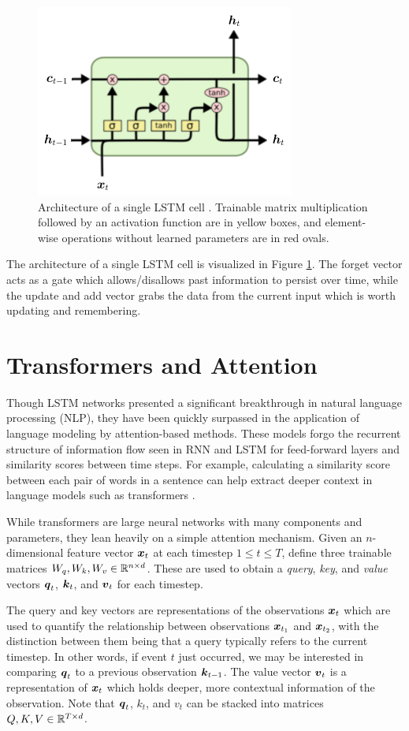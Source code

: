 \begin{figure}[h]
  \centering
  \includegraphics[width=.5\textwidth]{img/lstm_visual}
  \caption{Architecture of a single LSTM cell \cite{olah2015}. Trainable matrix multiplication followed by an activation function are in yellow boxes, and element-wise operations without learned parameters are in red ovals.}
  \label{fig:lstm_visual}
\end{figure}

The architecture of a single LSTM cell is visualized in Figure \ref{fig:lstm_visual}. The forget vector acts as a gate which allows/disallows past information to persist over time, while the update and add vector grabs the data from the current input which is worth updating and remembering.


\section{Transformers and Attention}\label{sec:transformers}
Though LSTM networks presented a significant breakthrough in natural language processing (NLP), they have been quickly surpassed in the application of language modeling by attention-based methods. These models forgo the recurrent structure of information flow seen in RNN and LSTM for feed-forward layers and similarity scores between time steps. For example, calculating a similarity score between each pair of words in a sentence can help extract deeper context in language models such as transformers \cite{vaswani2017}.

While transformers are large neural networks with many components and parameters, they lean heavily on a simple attention mechanism. Given an $n$-dimensional feature vector $\boldsymbol{x}_t$ at each timestep $1\leq t\leq T$, define three trainable matrices $W_q, W_k, W_v \in \mathbb{R}^{n\times d}$. These are used to obtain a \textit{query}, \textit{key}, and \textit{value} vectors $\boldsymbol{q}_t$, $\boldsymbol{k}_t$, and $\boldsymbol{v}_t$ for each timestep. 

The query and key vectors are representations of the observations $\boldsymbol{x}_t$ which are used to quantify the relationship between observations $\boldsymbol{x}_{t_1}$ and $\boldsymbol{x}_{t_2}$, with the distinction between them being that a query typically refers to the current timestep. In other words, if event $t$ just occurred, we may be interested in comparing $\boldsymbol{q}_t$ to a previous observation $\boldsymbol{k}_{t-1}$. The value vector $\boldsymbol{v}_t$ is a representation of $\boldsymbol{x}_t$ which holds deeper, more contextual information of the observation. Note that $\boldsymbol{q}_t$, $k_t$, and $v_t$ can be stacked into matrices $Q,K,V \in \mathbb{R}^{T\times d}$. 

